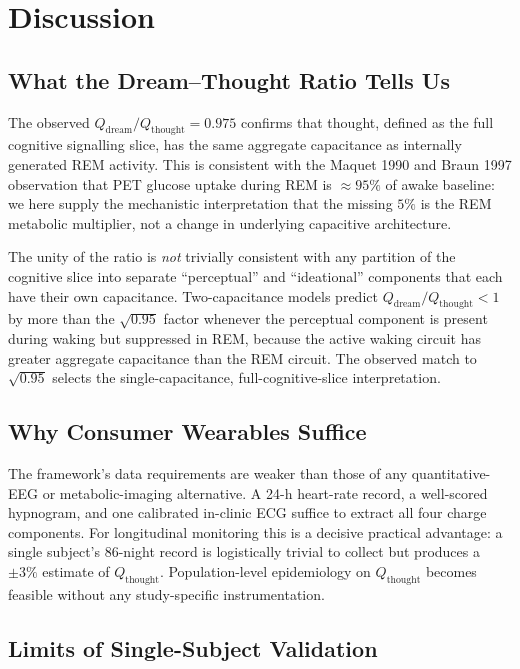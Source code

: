 \documentclass[11pt,twocolumn,a4paper]{article}
\theoremstyle{definition}
\theoremstyle{remark}
\newcommand{\Qth}{Q_{\mathrm{thought}}}
\newcommand{\Qdr}{Q_{\mathrm{dream}}}
\begin{document}
\section{Discussion}

\subsection{What the Dream--Thought Ratio Tells Us}

The observed $\Qdr/\Qth = 0.975$ confirms that thought, defined as
the full cognitive signalling slice, has the same aggregate capacitance
as internally generated REM activity. This is consistent with the
Maquet 1990 and Braun 1997 observation that PET glucose uptake during
REM is $\approx 95\%$ of awake baseline: we here supply the
mechanistic interpretation that the missing $5\%$ is the
REM metabolic multiplier, not a change in underlying capacitive
architecture.

The unity of the ratio is \emph{not} trivially consistent with any
partition of the cognitive slice into separate ``perceptual'' and
``ideational'' components that each have their own capacitance.
Two-capacitance models predict $\Qdr/\Qth<1$ by
more than the $\sqrt{0.95}$ factor whenever the perceptual component
is present during waking but suppressed in REM, because
the active waking circuit has greater aggregate capacitance than
the REM circuit. The observed match to $\sqrt{0.95}$ selects the
single-capacitance, full-cognitive-slice interpretation.

\subsection{Why Consumer Wearables Suffice}

The framework's data requirements are weaker than those of any
quantitative-EEG or metabolic-imaging alternative. A 24-h
heart-rate record, a well-scored hypnogram, and one calibrated
in-clinic ECG suffice to extract all four charge components. For
longitudinal monitoring this is a decisive practical advantage: a
single subject's 86-night record is logistically trivial to collect
but produces a $\pm 3\%$ estimate of $\Qth$. Population-level
epidemiology on $\Qth$ becomes feasible without any study-specific
instrumentation.

\subsection{Limits of Single-Subject Validation}
\end{document}
